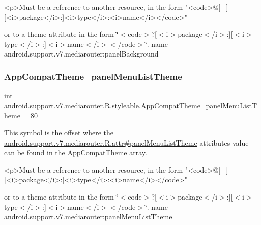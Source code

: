 \begin{DoxyVerb}      <p>Must be a reference to another resource, in the form "<code>@[+][<i>package</i>:]<i>type</i>:<i>name</i></code>"
\end{DoxyVerb}
 or to a theme attribute in the form \char`\"{}$<$code$>$?\mbox{[}$<$i$>$package$<$/i$>$\+:\mbox{]}\mbox{[}$<$i$>$type$<$/i$>$\+:\mbox{]}$<$i$>$name$<$/i$>$$<$/code$>$\char`\"{}.  name android.\+support.\+v7.\+mediarouter\+:panel\+Background \mbox{\label{classandroid_1_1support_1_1v7_1_1mediarouter_1_1R_1_1styleable_a7c342f6f92ed7ad34951015f855a9db3}} 
\subsubsection{\texorpdfstring{App\+Compat\+Theme\+\_\+panel\+Menu\+List\+Theme}{AppCompatTheme\_panelMenuListTheme}}
{\footnotesize\ttfamily int android.\+support.\+v7.\+mediarouter.\+R.\+styleable.\+App\+Compat\+Theme\+\_\+panel\+Menu\+List\+Theme = 80\hspace{0.3cm}{\ttfamily [static]}}

This symbol is the offset where the \hyperlink{classandroid_1_1support_1_1v7_1_1mediarouter_1_1R_1_1attr_ab31a72aff48e97ff68184ca0bed5c54d}{android.\+support.\+v7.\+mediarouter.\+R.\+attr\#panel\+Menu\+List\+Theme} attribute\textquotesingle{}s value can be found in the \hyperlink{classandroid_1_1support_1_1v7_1_1mediarouter_1_1R_1_1styleable_a4e3d3900c75d49aeb2f283cac00214d6}{App\+Compat\+Theme} array.

\begin{DoxyVerb}      <p>Must be a reference to another resource, in the form "<code>@[+][<i>package</i>:]<i>type</i>:<i>name</i></code>"
\end{DoxyVerb}
 or to a theme attribute in the form \char`\"{}$<$code$>$?\mbox{[}$<$i$>$package$<$/i$>$\+:\mbox{]}\mbox{[}$<$i$>$type$<$/i$>$\+:\mbox{]}$<$i$>$name$<$/i$>$$<$/code$>$\char`\"{}.  name android.\+support.\+v7.\+mediarouter\+:panel\+Menu\+List\+Theme \mbox{\label{classandroid_1_1support_1_1v7_1_1mediarouter_1_1R_1_1styleable_ab0f7f7adcabb13c0fbfe3555aa27d52e}} 
